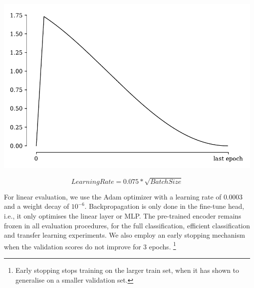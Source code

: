 \begin{marginfigure}
    \includegraphics[width=\textwidth]{figs/cosine_annealing_schedule.pdf}
    \caption{Learning rate schedule: a warm-up is performed before the learning rate is adjusted using a cosine annealing schedule. In this example, the learning rate linearly scales to 1.75 before decreasing back to near-zero at the last epoch.}
    \label{fig:cosine_annealing_lr}
\end{marginfigure}

\begin{equation}
    \label{eq:sqrt_lr}
    Learning Rate = 0.075 * \sqrt{Batch Size}
\end{equation}

For linear evaluation, we use the Adam optimizer with a learning rate of $0.0003$ and a weight decay of $10^{-6}$. Backpropagation is only done in the fine-tune head, i.e., it only optimises the linear layer or MLP. The pre-trained encoder remains frozen in all evaluation procedures, for the full classification, efficient classification and transfer learning experiments.
We also employ an early stopping mechanism when the validation scores do not improve for 3 epochs. \footnote{Early stopping stops training on the larger train set, when it has shown to generalise on a smaller validation set.}